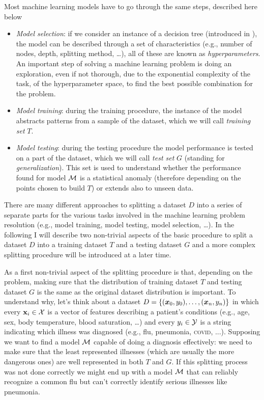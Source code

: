 Most machine learning models have to go through the same steps, described here below
\begin{itemize}
	\item \emph{Model selection}: if we consider an instance of a decision tree (introduced in
	      ), the model can be described through a set of characteristics (e.g.,
	      number of nodes, depth, splitting method, \ldots), all of these are known as
	      \emph{hyperparameters}. An important step of solving a machine learning problem is
	      doing an exploration, even if not thorough, due to the exponential complexity of the
	      task, of the hyperparameter space, to find the best possible combination for the
	      problem.
	\item \emph{Model training}: during the training procedure, the instance of the model abstracts
	      patterns from a sample of the dataset, which we will call \emph{training set} $T$.
	\item \emph{Model testing}: during the testing procedure the model performance is tested on a
	      part of the dataset, which we will call \emph{test set} $G$ (standing for
	      \emph{generalization}). This set is used to understand whether the performance found for model
	      $\mathcal{M}$ is a statistical anomaly (therefore depending on the points
	      chosen to build $T$) or extends also to unseen data.
\end{itemize}

There are many different approaches to splitting a dataset $D$ into a series of separate parts
for the various tasks involved in the machine learning problem resolution (e.g., model training,
model testing, model selection, \ldots). In the following I will describe two non-trivial aspects of
the basic procedure to split a dataset $D$ into a training dataset $T$ and a testing dataset $G$ and a
more complex splitting procedure will be introduced at a later time.

\medskip

As a first non-trivial aspect of the splitting procedure is that, depending on the problem, making
sure that the distribution of training dataset $T$ and testing dataset $G$ is the same as the
original dataset distribution is important. To understand why, let's think about a dataset
$D = \{(\boldsymbol{x}_0, y_0), \ldots, (\boldsymbol{x}_n, y_n)\}$ in which every $\mathbf{x}_i \in \mathcal{X}$ is a vector of features describing a patient's
conditions (e.g., age, sex, body temperature, blood saturation, \ldots) and every $y_i \in \mathcal{Y}$ is
a string indicating which illness was diagnosed (e.g., flu, pneumonia, \textsc{covid}, ...). Supposing we want to find a
model $\mathcal{M}$ capable of doing a diagnosis effectively: we need to make sure that the least
represented illnesses (which are usually the more dangerous ones) are well represented in both $T$
and $G$. If this splitting process was not done correctly we might end up with a model $\mathcal{M}$ that
can reliably recognize a common flu but can't correctly identify serious illnesses like pneumonia.

